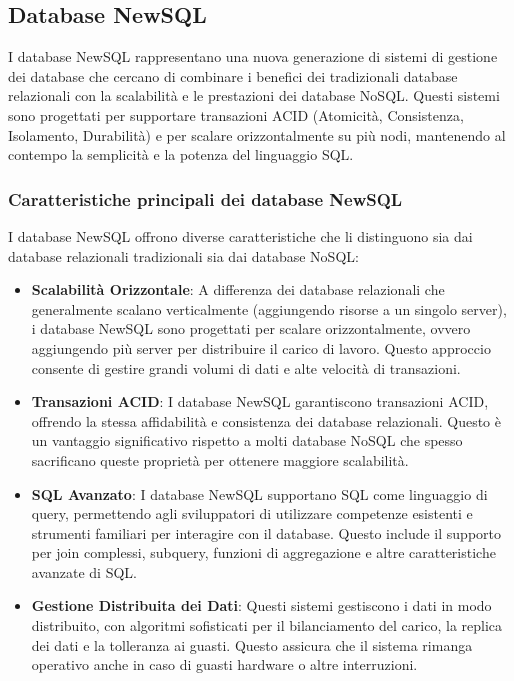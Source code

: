 \documentclass{article}
\begin{document}
\subsection{Database NewSQL}
I database NewSQL rappresentano una nuova generazione di sistemi di gestione dei database che cercano di combinare i benefici dei tradizionali database relazionali con la scalabilità e le prestazioni dei database NoSQL. Questi sistemi sono progettati per supportare transazioni ACID (Atomicità, Consistenza, Isolamento, Durabilità) e per scalare orizzontalmente su più nodi, mantenendo al contempo la semplicità e la potenza del linguaggio SQL.

\subsubsection{Caratteristiche principali dei database NewSQL}
I database NewSQL offrono diverse caratteristiche che li distinguono sia dai database relazionali tradizionali sia dai database NoSQL:

\begin{itemize}
    \item \textbf{Scalabilità Orizzontale}: A differenza dei database relazionali che generalmente scalano verticalmente (aggiungendo risorse a un singolo server), i database NewSQL sono progettati per scalare orizzontalmente, ovvero aggiungendo più server per distribuire il carico di lavoro. Questo approccio consente di gestire grandi volumi di dati e alte velocità di transazioni.
    \item \textbf{Transazioni ACID}: I database NewSQL garantiscono transazioni ACID, offrendo la stessa affidabilità e consistenza dei database relazionali. Questo è un vantaggio significativo rispetto a molti database NoSQL che spesso sacrificano queste proprietà per ottenere maggiore scalabilità.
    \item \textbf{SQL Avanzato}: I database NewSQL supportano SQL come linguaggio di query, permettendo agli sviluppatori di utilizzare competenze esistenti e strumenti familiari per interagire con il database. Questo include il supporto per join complessi, subquery, funzioni di aggregazione e altre caratteristiche avanzate di SQL.
    \item \textbf{Gestione Distribuita dei Dati}: Questi sistemi gestiscono i dati in modo distribuito, con algoritmi sofisticati per il bilanciamento del carico, la replica dei dati e la tolleranza ai guasti. Questo assicura che il sistema rimanga operativo anche in caso di guasti hardware o altre interruzioni.
\end{itemize}
\end{document}
